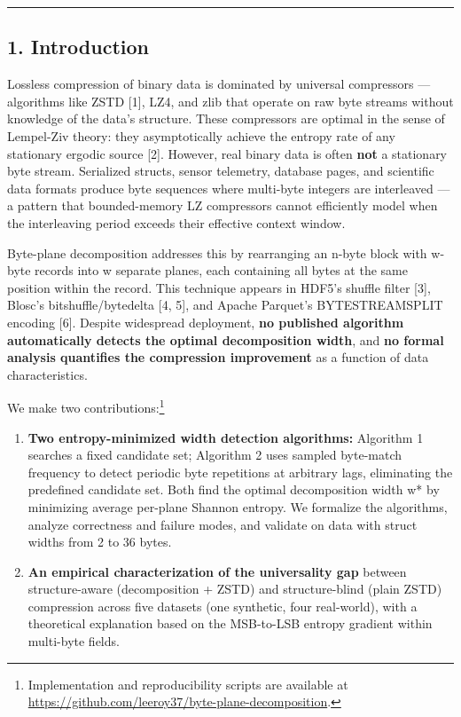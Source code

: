 \documentclass[
  11pt,
  letterpaper,
]{article}
\makeatletter
\renewcommand{\_}{\bpd@origunderscore\allowbreak}
\makeatother
\begin{document}
\begin{center}\rule{0.5\linewidth}{0.5pt}\end{center}

\hypertarget{introduction}{%
\subsection{1. Introduction}\label{introduction}}

Lossless compression of binary data is dominated by universal
compressors --- algorithms like ZSTD {[}1{]}, LZ4, and zlib that operate
on raw byte streams without knowledge of the data's structure. These
compressors are optimal in the sense of Lempel-Ziv theory: they
asymptotically achieve the entropy rate of any stationary ergodic source
{[}2{]}. However, real binary data is often \textbf{not} a stationary
byte stream. Serialized structs, sensor telemetry, database pages, and
scientific data formats produce byte sequences where multi-byte integers
are interleaved --- a pattern that bounded-memory LZ compressors cannot
efficiently model when the interleaving period exceeds their effective
context window.

Byte-plane decomposition addresses this by rearranging an n-byte block
with w-byte records into w separate planes, each containing all bytes at
the same position within the record. This technique appears in HDF5's
shuffle filter {[}3{]}, Blosc's bitshuffle/bytedelta {[}4, 5{]}, and
Apache Parquet's BYTE\_STREAM\_SPLIT encoding {[}6{]}. Despite
widespread deployment, \textbf{no published algorithm automatically
detects the optimal decomposition width}, and \textbf{no formal analysis
quantifies the compression improvement} as a function of data
characteristics.

We make two contributions:\footnote{Implementation and reproducibility
  scripts are available at
  \url{https://github.com/leeroy37/byte-plane-decomposition}.}

\begin{enumerate}
\def\labelenumi{\arabic{enumi}.}
\item
  \textbf{Two entropy-minimized width detection algorithms:} Algorithm 1
  searches a fixed candidate set; Algorithm 2 uses sampled byte-match
  frequency to detect periodic byte repetitions at arbitrary lags,
  eliminating the predefined candidate set. Both find the optimal
  decomposition width w* by minimizing average per-plane Shannon
  entropy. We formalize the algorithms, analyze correctness and failure
  modes, and validate on data with struct widths from 2 to 36 bytes.
\item
  \textbf{An empirical characterization of the universality gap} between
  structure-aware (decomposition + ZSTD) and structure-blind (plain
  ZSTD) compression across five datasets (one synthetic, four
  real-world), with a theoretical explanation based on the MSB-to-LSB
  entropy gradient within multi-byte fields.
\end{enumerate}
\end{document}
